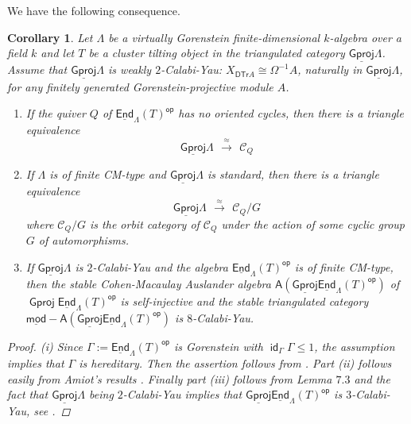 \documentclass[oneside, a4paper,reqno]{amsart}
\numberwithin{equation}{section}
\newtheorem{cor}[thm]{Corollary}
\theoremstyle{definition}
\begin{document}
We have the following consequence.

 \begin{cor} Let $\Lambda$ be a virtually Gorenstein finite-dimensional $k$-algebra over a field $k$ and let
 $ T$ be a cluster tilting object in the triangulated category
 ${\operatorname{\underline{\mathsf{Gproj}}}\nolimits}\Lambda$. Assume that ${\operatorname{\underline{\mathsf{Gproj}}}\nolimits}\Lambda$ is weakly
 $2$-Calabi-Yau:  $X_{\mathsf{DTr}A} \cong \Omega^{-1}A$, naturally
 in ${\operatorname{\underline{\mathsf{Gproj}}}\nolimits}\Lambda$, for any finitely generated Gorenstein-projective
 module $A$.
 \begin{enumerate}
 \item If the quiver $Q$ of $\operatorname*{\underline{\mathsf{End}}}_{\Lambda}(T)^\operatorname*{\mathsf{op}}$ has no oriented cycles,
 then there is a triangle equivalence
 \[{\operatorname{\underline{\mathsf{Gproj}}}\nolimits}\Lambda \,\ \stackrel{\approx}{\longrightarrow} \,\ {\mathscr C}_{Q}\]
 \item If $\Lambda$ is of finite CM-type and ${\operatorname{\underline{\mathsf{Gproj}}}\nolimits}\Lambda$ is standard, then there is a triangle equivalence
 \[ {\operatorname{\underline{\mathsf{Gproj}}}\nolimits}\Lambda \,\ \stackrel{\approx}{\longrightarrow} \,\  {\mathscr C}_{Q}/G\] where
  ${\mathscr C}_{Q}/G$ is the orbit category of ${\mathscr C}_{Q}$ under the action of some cyclic group $G$ of
 automorphisms.
 \item If ${\operatorname{\underline{\mathsf{Gproj}}}\nolimits}\Lambda$ is $2$-Calabi-Yau and the algebra $\operatorname*{\underline{\mathsf{End}}}_{\Lambda}(T)^\operatorname*{\mathsf{op}}$ is of finite CM-type, then the stable Cohen-Macaulay Auslander
algebra $\mathsf{A}({\operatorname{\underline{\mathsf{Gproj}}}\nolimits}\operatorname*{\underline{\mathsf{End}}}_{\Lambda}(T)^\operatorname*{\mathsf{op}})$ of ${\operatorname{\mathsf{Gproj}}\nolimits}\operatorname*{\underline{\mathsf{End}}}_{\Lambda}(T)^\operatorname*{\mathsf{op}}$ is
self-injective and the stable triangulated category
$\operatorname*{\underline{\mathsf{mod}}-\!}\mathsf{A}({\operatorname{\underline{\mathsf{Gproj}}}\nolimits}\operatorname*{\underline{\mathsf{End}}}_{\Lambda}(T)^\operatorname*{\mathsf{op}})$ is $8$-Calabi-Yau.
 \end{enumerate}
\begin{proof} (i) Since $\Gamma := \operatorname*{\underline{\mathsf{End}}}_{\Lambda}(T)^\operatorname*{\mathsf{op}}$ is Gorenstein with $\operatorname*{\mathsf{id}}_{\Gamma}\Gamma \leq 1$,
the assumption implies that $\Gamma$ is
hereditary. Then the assertion follows from \cite{KR:acyclic}. Part
(ii) follows easily from Amiot's results \cite{Amiot}. Finally part
(iii) follows from Lemma $7.3$ and the fact that ${\operatorname{\underline{\mathsf{Gproj}}}\nolimits}\Lambda$ being $2$-Calabi-Yau implies that ${\operatorname{\underline{\mathsf{Gproj}}}\nolimits}\operatorname*{\underline{\mathsf{End}}}_{\Lambda}(T)^\operatorname*{\mathsf{op}}$ is $3$-Calabi-Yau, see \cite{KR}.
\end{proof}
 \end{cor}
\end{document}
